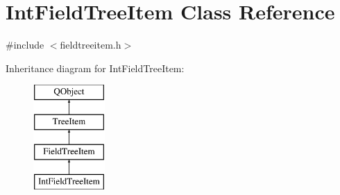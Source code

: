 \hypertarget{class_int_field_tree_item}{\section{Int\-Field\-Tree\-Item Class Reference}
\label{class_int_field_tree_item}
}


{\ttfamily \#include $<$fieldtreeitem.\-h$>$}

Inheritance diagram for Int\-Field\-Tree\-Item\-:\begin{figure}[H]
\begin{center}
\leavevmode
\includegraphics[height=4.000000cm]{class_int_field_tree_item}
\end{center}
\end{figure}
